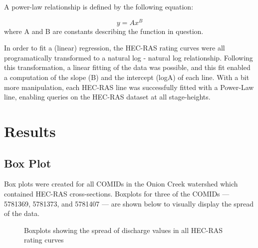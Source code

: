 \documentclass[12pt]{article}
\begin{document}
A power-law relationship is defined by the following equation: 

\begin{equation}
y = Ax^B
\end{equation}
where A and B are constants describing the function in question. 

In order to fit a (linear) regression, the HEC-RAS rating curves were all programatically transformed to a natural log - natural log relationship. Following this transformation, a linear fitting of the data was possible, and this fit enabled a computation of the slope (B) and the intercept (logA) of each line. With a bit more manipulation, each HEC-RAS line was successfully fitted with a Power-Law line, enabling queries on the HEC-RAS dataset at all stage-heights. 

\section*{Results}

\subsection*{Box Plot}

Box plots were created for all COMIDs in the Onion Creek watershed which contained HEC-RAS cross-sections. Boxplots for three of the COMIDs --- 5781369, 5781373, and 5781407 --- are shown below to visually display the spread of the data. 

\begin{figure}[h!]
\caption{Boxplots showing the spread of discharge values in all HEC-RAS rating curves} \label{fig:hecrasboxplots}
\end{figure}
\end{document}
